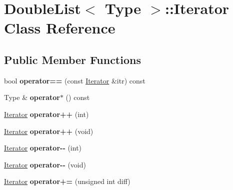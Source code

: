 \hypertarget{classDoubleList_1_1Iterator}{}\section{Double\+List$<$ Type $>$\+:\+:Iterator Class Reference}
\label{classDoubleList_1_1Iterator}
\subsection*{Public Member Functions}
\begin{DoxyCompactItemize}
\item 
\mbox{\label{classDoubleList_1_1Iterator_a2e4afd4fba6fa94c2fe3eca0b513c6f6}} 
bool {\bfseries operator==} (const \hyperlink{classDoubleList_1_1Iterator}{Iterator} \&itr) const
\item 
\mbox{\label{classDoubleList_1_1Iterator_a7461f915611d1696e6b633a265c794e4}} 
Type \& {\bfseries operator$\ast$} () const
\item 
\mbox{\label{classDoubleList_1_1Iterator_a9dbcee680a81658b47a1e39a4a70b647}} 
\hyperlink{classDoubleList_1_1Iterator}{Iterator} {\bfseries operator++} (int)
\item 
\mbox{\label{classDoubleList_1_1Iterator_a753e191102f9418a7519346d88bb7e64}} 
\hyperlink{classDoubleList_1_1Iterator}{Iterator} {\bfseries operator++} (void)
\item 
\mbox{\label{classDoubleList_1_1Iterator_a5a07b768bba748989d98d929699554fd}} 
\hyperlink{classDoubleList_1_1Iterator}{Iterator} {\bfseries operator-\/-\/} (int)
\item 
\mbox{\label{classDoubleList_1_1Iterator_aa0266dd5255e32169e22846d04b83f8b}} 
\hyperlink{classDoubleList_1_1Iterator}{Iterator} {\bfseries operator-\/-\/} (void)
\item 
\mbox{\label{classDoubleList_1_1Iterator_a2e3d2c2bf3e578bb022a0e32113c7e01}} 
\hyperlink{classDoubleList_1_1Iterator}{Iterator} {\bfseries operator+=} (unsigned int diff)
\end{DoxyCompactItemize}
